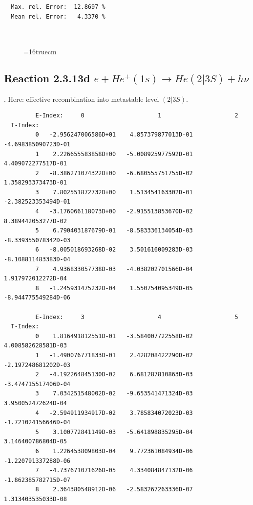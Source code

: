 \documentclass[12pt,dvips]{article}
\begin{document}
\begin{small}
\begin{verbatim}
  Max. rel. Error:  12.8697 %
  Mean rel. Error:   4.3370 %



\end{verbatim}\end{small}
\begin{figure} \label{2.3.13c}
\epsfxsize=16truecm
\end{figure}
\newpage

\subsection{
Reaction 2.3.13d  $e + He^+(1s) \rightarrow He(2|3S) + h\nu $ }
\cite{kn:Fujimoto}. Here: effective recombination into metastable
level $(2|3S)$.

\begin{small}\begin{verbatim}
         E-Index:     0                     1                     2
  T-Index:
         0   -2.956247006586D+01    4.857379877013D-01   -4.698385090723D-01
         1    2.226655583858D+00   -5.008925977592D-01    4.409072277517D-01
         2   -8.386271074322D+00   -6.680555751755D-02    1.358293373473D-01
         3    7.802551872732D+00    1.513454163302D-01   -2.382523353494D-01
         4   -3.176066118073D+00   -2.915513853670D-02    8.389442053277D-02
         5    6.790403187679D-01   -8.583336134054D-03   -8.339355078342D-03
         6   -8.005018693268D-02    3.501616009283D-03   -8.108811483383D-04
         7    4.936833057738D-03   -4.038202701566D-04    1.917972012272D-04
         8   -1.245931475232D-04    1.550754095349D-05   -8.944775549284D-06

         E-Index:     3                     4                     5
  T-Index:
         0    1.816491812551D-01   -3.584007722558D-02    4.008582628581D-03
         1   -1.490076771833D-01    2.428208422290D-02   -2.197248681202D-03
         2   -4.192264845130D-02    6.681287810863D-03   -3.474715517406D-04
         3    7.034251548002D-02   -9.653541471324D-03    3.950052472624D-04
         4   -2.594911934917D-02    3.785834072023D-03   -1.721024156646D-04
         5    3.100772841149D-03   -5.641898835295D-04    3.146400786804D-05
         6    1.226453809803D-04    9.772361084934D-06   -1.220791337288D-06
         7   -4.737671071626D-05    4.334084847132D-06   -1.862385782715D-07
         8    2.364380548912D-06   -2.583267263336D-07    1.313403535033D-08


\end{verbatim}
\end{small}
\end{document}
